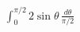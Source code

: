 \documentclass[preview]{standalone}
\begin{document}
\begin{align*}
\int_0^{\pi/2}2\sin\theta\,\frac{d\theta}{\pi/2}
\end{align*}
\end{document}
